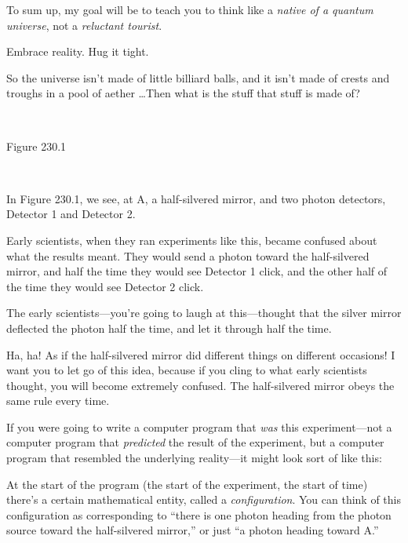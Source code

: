 {
 To sum up, my goal will be to teach you to think like a
\textit{native of a quantum universe}, not a \textit{reluctant
tourist}.}

{
 Embrace reality. Hug it tight.}

\myendsectiontext


{
 So the universe isn't made of little billiard
balls, and it isn't made of crests and troughs in a
pool of aether \ldots Then what is the stuff that stuff is made of?}

{
 ~}

{\centering
{}
 \newline
 Figure 230.1
\par}


\bigskip

{
 ~}

{
 In Figure 230.1, we see, at A, a half-silvered mirror, and two
photon detectors, Detector 1 and Detector 2.}

{
 Early scientists, when they ran experiments like this, became
confused about what the results meant. They would send a photon toward
the half-silvered mirror, and half the time they would see Detector 1
click, and the other half of the time they would see Detector 2 click.}

{
 The early scientists---you're going to laugh at
this---thought that the silver mirror deflected the photon half the
time, and let it through half the time.}

{
 Ha, ha! As if the half-silvered mirror did different things on
different occasions! I want you to let go of this idea, because if you
cling to what early scientists thought, you will become extremely
confused. The half-silvered mirror obeys the same rule every time.}

{
 If you were going to write a computer program that \textit{was}
this experiment---not a computer program that \textit{predicted} the
result of the experiment, but a computer program that resembled the
underlying reality---it might look sort of like this:}

{
 At the start of the program (the start of the experiment, the
start of time) there's a certain mathematical entity,
called a \textit{configuration}. You can think of this configuration as
corresponding to ``there is one photon heading from
the photon source toward the half-silvered mirror,''
or just ``a photon heading toward
A.''}

